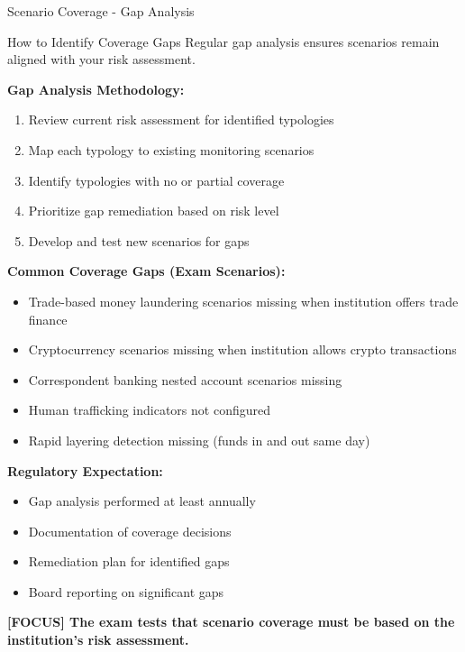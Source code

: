 \documentclass[11pt,a4paper]{beamer}
\newcommand{\examfocus}[1]{\textcolor{orange!80!black}{\textbf{[FOCUS] #1}}}
\begin{document}
	\begin{frame}{Scenario Coverage - Gap Analysis}
		\begin{block}{How to Identify Coverage Gaps}
			Regular gap analysis ensures scenarios remain aligned with your risk assessment.
		\end{block}
		
		\textbf{Gap Analysis Methodology:}
		\begin{enumerate}
			\item Review current risk assessment for identified typologies
			\item Map each typology to existing monitoring scenarios
			\item Identify typologies with no or partial coverage
			\item Prioritize gap remediation based on risk level
			\item Develop and test new scenarios for gaps
		\end{enumerate}
		
		\textbf{Common Coverage Gaps (Exam Scenarios):}
		\begin{itemize}
			\item Trade-based money laundering scenarios missing when institution offers trade finance
			\item Cryptocurrency scenarios missing when institution allows crypto transactions
			\item Correspondent banking nested account scenarios missing
			\item Human trafficking indicators not configured
			\item Rapid layering detection missing (funds in and out same day)
		\end{itemize}
		
		\textbf{Regulatory Expectation:}
		\begin{itemize}
			\item Gap analysis performed at least annually
			\item Documentation of coverage decisions
			\item Remediation plan for identified gaps
			\item Board reporting on significant gaps
		\end{itemize}
		
		\examfocus{The exam tests that scenario coverage must be based on the institution's risk assessment.}
	\end{frame}
	
\end{document}

